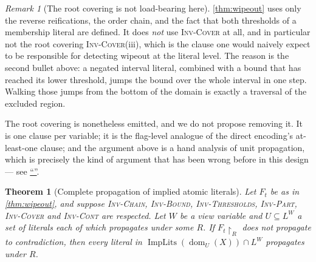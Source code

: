 \documentclass[11pt,a4paper]{article}
\theoremstyle{plain}
\newtheorem{theoremT}{Theorem}
\theoremstyle{definition}
\theoremstyle{remark}
\newtheorem{remarkN}{Remark}
\newcommand{\fname}[1]{\ensuremath{\operatorname{#1}}}
\newcommand{\dm}{\fname{dom}}
\newcommand{\ImpLits}{\fname{ImpLits}}
\newcommand{\inv}[1]{\textnormal{\textsc{Inv-#1}}}
\newcommand{\nsec}[1]{\hyperref[#1]{``\nameref*{#1}''}}
\newcommand{\invChain}{\inv{Chain}}
\newcommand{\invThresholds}{\inv{Thresholds}}
\newcommand{\invPart}{\inv{Part}}
\newcommand{\invCover}{\inv{Cover}}
\newcommand{\invCont}{\inv{Cont}}
\begin{document}
\begin{remarkN}[The root covering is not load-bearing here]
\label{rem:rootcovering}
\cref{thm:wipeout} uses only the reverse reifications, the order chain, and the
fact that both thresholds of a membership literal are defined.  It does \emph{not} use
\invCover{} at all, and in particular not the root covering \invCover{}(iii),
which is the clause one would naively expect to be responsible for detecting
wipeout at the literal level.  The reason is the second bullet above: a negated
interval literal, combined with a bound that has reached its lower threshold, jumps
the bound over the whole interval in one step.  Walking those jumps from the
bottom of the domain is exactly a traversal of the excluded region.

The root covering is nonetheless emitted, and we do not propose removing it.  It
is one clause per variable; it is the flag-level analogue of the direct
encoding's at-least-one clause; and the argument above is a hand analysis of
unit propagation, which is precisely the kind of argument that has been wrong
before in this design --- see \nsec{sec:loadbearing}.
\end{remarkN}

\begin{theoremT}[Complete propagation of implied atomic literals]
\label{thm:complete}
Let $F_t$ be as in \cref{thm:wipeout}, and suppose \invChain{}, \inv{Bound},
\invThresholds{}, \invPart{}, \invCover{} and \invCont{} are respected.  Let $W$ be a
view variable and $U\subseteq L^W$ a set of literals each of which propagates
under some $R$.  If $F_t\!\restriction_R$ does not propagate to contradiction,
then every literal in $\ImpLits(\dm_U(X))\cap L^W$ propagates under $R$.
\end{theoremT}
\end{document}
